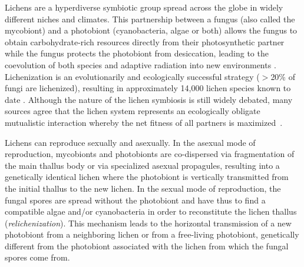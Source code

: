 \documentclass[runningheads,a4paper]{llncs}
\begin{document}
Lichens are a hyperdiverse symbiotic group spread across the globe in widely different niches and climates. This partnership between a fungus (also called the mycobiont) and a photobiont (cyanobacteria, algae or both) allows the fungus to obtain carbohydrate-rich resources directly from their photosynthetic partner \cite{lutzoni2009lichens} while the fungus protects the photobiont from desiccation, leading to the coevolution of both species and adaptive radiation into new environments \cite{nash1996lichen}. Lichenization is an evolutionarily and ecologically successful strategy ($>$20\% of fungi are lichenized), resulting in approximately 14,000 lichen species known to date \cite{lutzoni2009lichens,honegger1998lichen}. Although the nature of the lichen symbiosis is still widely debated, many sources agree that the lichen system represents an ecologically obligate mutualistic interaction whereby the net fitness of all partners is maximized~\cite{bronstein1994our,honegger1998lichen}.


Lichens can reproduce sexually and asexually. In the asexual mode of reproduction, mycobionts and photobionts are co-dispersed via fragmentation of the main thallus body or via specialized asexual propagules, resulting into a genetically identical lichen where the photobiont is vertically transmitted from the initial thallus to the new lichen. 
In the sexual mode of reproduction, the fungal spores are spread without the photobiont and have thus to find a compatible algae and/or cyanobacteria in order to reconstitute the lichen thallus (\emph{relichenization}). This mechanism leads to the horizontal transmission of a new photobiont from a neighboring lichen or from a free-living photobiont, genetically different from the photobiont associated with the lichen from which the fungal spores come from. 
\end{document}
